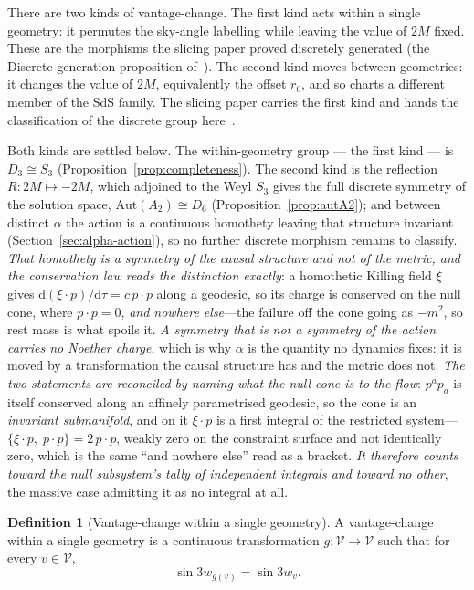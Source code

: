 \documentclass[11pt,a4paper]{article}
\theoremstyle{definition}
\newtheorem{definition}[theorem]{Definition}
\newcommand{\dd}{\mathrm{d}}   %
\begin{document}
There are two kinds of vantage-change. The first kind acts within a single geometry: it permutes the sky-angle labelling while leaving the value of $2M$ fixed. These are the morphisms the slicing paper proved discretely generated (the Discrete-generation proposition of~\cite{JanzenSlicing}). The second kind moves between geometries: it changes the value of $2M$, equivalently the offset $r_{0}$, and so charts a different member of the SdS family. The slicing paper carries the first kind and hands the classification of the discrete group here~\cite{JanzenSlicing}.

Both kinds are settled below. The within-geometry group --- the first kind --- is $D_{3}\cong S_{3}$ (Proposition~\ref{prop:completeness}). The second kind is the reflection $R:2M\mapsto-2M$, which adjoined to the Weyl $S_{3}$ gives the full discrete symmetry of the solution space, $\mathrm{Aut}(A_{2})\cong D_{6}$ (Proposition~\ref{prop:autA2}); and between distinct $\alpha$ the action is a continuous homothety leaving that structure invariant (Section~\ref{sec:alpha-action}), so no further discrete morphism remains to classify. \emph{That homothety is a symmetry of the causal structure and not of the metric, and the conservation law reads the distinction exactly}: a homothetic Killing field $\xi$ gives $\dd(\xi\!\cdot\!p)/\dd\tau=c\,p\!\cdot\!p$ along a geodesic, so its charge is conserved on the null cone, where $p\!\cdot\!p=0$, \emph{and nowhere else}---the failure off the cone going as $-m^{2}$, so rest mass is what spoils it. \emph{A symmetry that is not a symmetry of the action carries no Noether charge}, which is why $\alpha$ is the quantity no dynamics fixes: it is moved by a transformation the causal structure has and the metric does not. \emph{The two statements are reconciled by naming what the null cone is to the flow}: $p^{a}p_{a}$ is itself conserved along an affinely parametrised geodesic, so the cone is an \emph{invariant submanifold}, and on it $\xi\!\cdot\!p$ is a first integral of the restricted system---$\{\xi\!\cdot\!p,\;p\!\cdot\!p\}=2\,p\!\cdot\!p$, weakly zero on the constraint surface and not identically zero, which is the same ``and nowhere else'' read as a bracket. \emph{It therefore counts toward the null subsystem's tally of independent integrals and toward no other}, the massive case admitting it as no integral at all.

\begin{definition}[Vantage-change within a single geometry]\label{def:morphism}
A vantage-change within a single geometry is a continuous transformation $g:\mathcal{V}\to\mathcal{V}$ such that for every $v\in\mathcal{V}$,
\[
\sin 3w_{g(v)} = \sin 3w_{v}.
\]
\end{definition}
\end{document}
